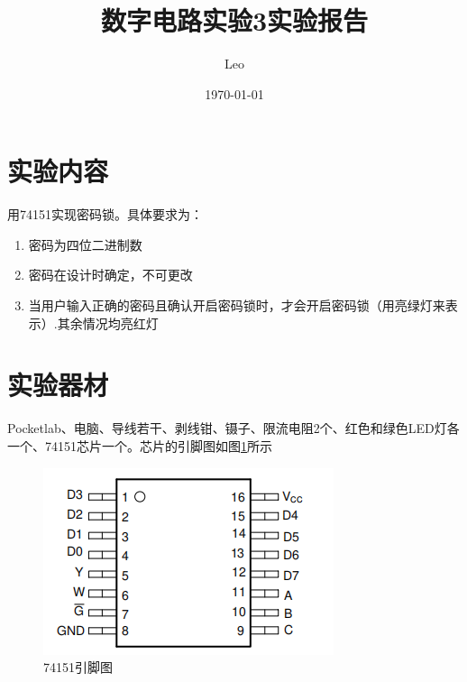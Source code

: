 \documentclass{ctexart}
\title{数字电路实验3\quad 实验报告}
\author{Leo}
\date{\today}
\begin{document}
\maketitle
\section{实验内容}
用74151实现密码锁。具体要求为：
\begin{enumerate}
    \item 密码为四位二进制数
    \item 密码在设计时确定，不可更改
    \item 当用户输入正确的密码且确认开启密码锁时，才会开启密码锁（用亮绿灯来表示）.其余情况均亮红灯
\end{enumerate}

\section{实验器材}
Pocketlab、电脑、导线若干、剥线钳、镊子、限流电阻2个、红色和绿色LED灯各一个、74151芯片一个。芯片的引脚图如图\ref{fig:74151引脚图}所示
\begin{figure}[H]
    \centering
    \includegraphics[width=0.4\linewidth]{74151.png}
    \caption{74151引脚图}
    \label{fig:74151引脚图}
\end{figure}
\end{document}
